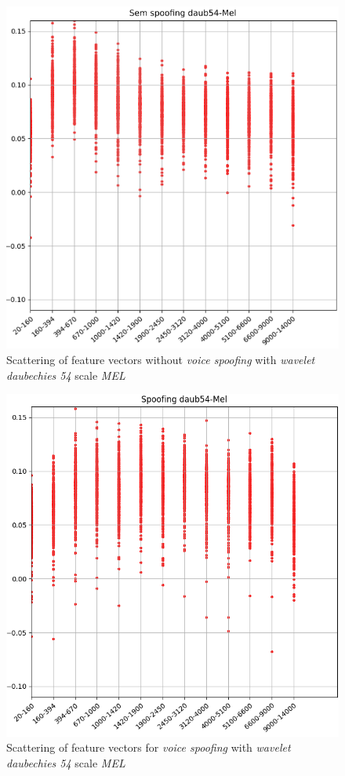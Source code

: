 \begin{figure}[!h]
	\centering
	\includegraphics[width=.70\linewidth, height=.68\linewidth]{images/results/barkVersusMel/liveDaub54Mel}
	\caption{Scattering of feature vectors without \textit{voice spoofing} with \textit{wavelet daubechies 54} scale \textit{MEL}}
	\label{fig:livedaub54mel}
\end{figure}

\begin{figure}[!h]
	\centering
	\includegraphics[width=.70\linewidth, height=.68\linewidth]{images/results/barkVersusMel/spoofingDaub54Mel}
	\caption{Scattering of feature vectors for \textit{voice spoofing} with \textit{wavelet daubechies 54} scale \textit{MEL}}
	\label{fig:spoofingdaub54mel}
\end{figure}
